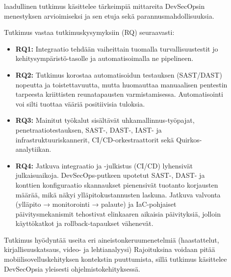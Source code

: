\documentclass[bscthesis,finnish,oneside,biblatex]{uefcsthesis}
\begin{document}
    \begin{description}
        \item[\cite{chung2024_devsecops}] laadullinen tutkimus käsittelee tärkeimpiä mittareita DevSecOpsin menestyksen arvioimiseksi ja sen etuja sekä parannusmahdollisuuksia.

        Tutkimus vastaa tutkimuskysymyksiin (RQ) seuraavasti:
        \begin{itemize}
            \item \textbf{RQ1:} Integraatio tehdään vaiheittain tuomalla turvallisuustestit jo kehitysympäristö-tasolle ja automatisoimalla ne pipelineen.
            \item \textbf{RQ2:} Tutkimus korostaa automatisoidun testauksen (SAST/DAST) nopeutta ja toistettavuutta, mutta huomauttaa manuaalisen pentestin tarpeesta kriittisten reunatapausten varmistamisessa. Automatisointi voi silti tuottaa vääriä positiivisia tuloksia.
            \item \textbf{RQ3:} Mainitut työkalut sisältävät uhkamallinnus-työpajat, penetraatiotestauksen, SAST-, DAST-, IAST- ja infrastruktuuriskannerit, CI/CD-orkestraattorit sekä Quirkos-analytiikan.
            \item \textbf{RQ4:} Jatkuva integraatio ja -julkistus (CI/CD) lyhensivät julkaisuaikoja. DevSecOps-putkeen upotetut SAST-, DAST- ja konttien konfiguraatio skannaukset pienensivät tuotanto korjausten määrää, mikä näkyi ylläpitokustannusten laskuna. Jatkuva valvonta (ylläpito → monitorointi → palaute) ja IaC-pohjaiset päivitysmekanismit tehostivat elinkaaren aikaisia päivityksiä, jolloin käyttökatkot ja rollback-tapaukset vähenevät.
        \end{itemize}

        Tutkimus hyödyntää useita eri aineistonkeruumenetelmiä (haastattelut, kirjallisuuskatsaus, video- ja lehtianalyysi)
        Rajoituksina voidaan pitää mobiilisovelluskehityksen kontekstin puuttumista, sillä tutkimus käsittelee DevSecOpsia yleisesti ohjelmistokehityksessä.
    \end{description}
\end{document}
